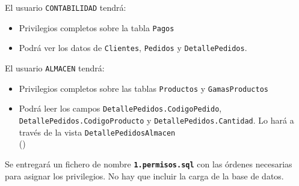 \begin{homeworkProblem}
  \begin{homeworkProblem2}
    El usuario \texttt{CONTABILIDAD} tendrá:
    \begin{itemize}
    \item Privilegios completos sobre la tabla \texttt{Pagos}
    \item Podrá ver  los datos de \texttt{Clientes}, \texttt{Pedidos} y \texttt{DetallePedidos}.
    \end{itemize}
  \end{homeworkProblem2}

  \begin{homeworkProblem2}
    El usuario \texttt{ALMACEN} tendrá:
    \begin{itemize}
    \item Privilegios completos sobre las tablas \texttt{Productos} y \texttt{GamasProductos}
    \item Podrá leer los campos \texttt{DetallePedidos.CodigoPedido}, \texttt{DetallePedidos.CodigoProducto} y \texttt{DetallePedidos.Cantidad}. Lo hará a través de la vista \texttt{DetallePedidosAlmacen} \\ ()
    \end{itemize}
  \end{homeworkProblem2}

  
  \begin{Aviso}
    Se entregará un fichero de nombre \textbf{\texttt{1.permisos.sql}} con las órdenes necesarias para asignar los privilegios. No hay que incluir la carga de la base de datos.
  \end{Aviso}

\end{homeworkProblem}
